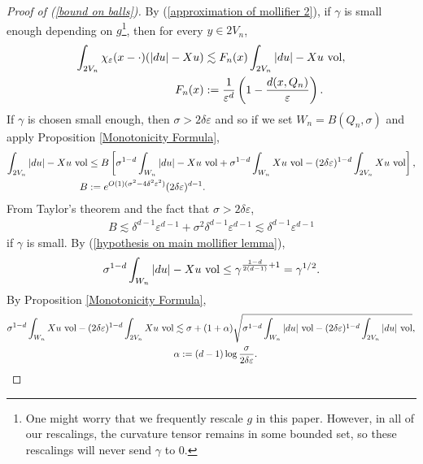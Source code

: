 \begin{proof}[Proof of (\ref{bound on balls})]
By (\ref{approximation of mollifier 2}), if $\gamma$ is small enough depending on $g$\footnote{One might worry that we frequently rescale $g$ in this paper.
However, in all of our rescalings, the curvature tensor remains in some bounded set, so these rescalings will never send $\gamma$ to $0$.}, then for every $y \in 2V_n$,
\begin{align*}
\int_{2V_n} \chi_\varepsilon(x - \cdot)(|du| - Xu) &\lesssim F_n(x) \int_{2V_n} |du| - Xu ~\mathrm{vol}, \\
F_n(x) &:= \frac{1}{\varepsilon^d}\left(1 - \frac{d(x, Q_n)}{\varepsilon}\right).
\end{align*}
If $\gamma$ is chosen small enough, then $\sigma > 2\delta\varepsilon$ and so if we set $W_n = B(Q_n, \sigma)$ and apply Proposition \ref{Monotonicity Formula},
\begin{align*}
\int_{2V_n}|du| - Xu ~\mathrm{vol} &\leq
B \left[\sigma^{1 - d}\int_{W_n} |du| - Xu ~\mathrm{vol} + \sigma^{1 - d}\int_{W_n} Xu ~\mathrm{vol} - (2\delta\varepsilon)^{1 - d}\int_{2V_n} Xu ~\mathrm{vol} \right],\\
B &:= e^{O(1)(\sigma^2 - 4\delta^2\varepsilon^2)}(2\delta\varepsilon)^{d - 1}.
\end{align*}
From Taylor's theorem and the fact that $\sigma > 2\delta\varepsilon$,
\begin{align*}
B \lesssim \delta^{d - 1} \varepsilon^{d - 1} + \sigma^2 \delta^{d - 1} \varepsilon^{d - 1} \lesssim \delta^{d - 1} \varepsilon^{d - 1}
\end{align*}
if $\gamma$ is small.
By (\ref{hypothesis on main mollifier lemma}),
$$\sigma^{1 - d}\int_{W_n} |du| - Xu ~\mathrm{vol} \leq \gamma^{\frac{1 - d}{2(d - 1)} + 1} = \gamma^{1/2}.$$
By Proposition \ref{Monotonicity Formula},
\begin{align*}
\sigma^{1 - d}\int_{W_n} Xu ~\mathrm{vol} - (2\delta\varepsilon)^{1 - d}\int_{2V_n} Xu ~\mathrm{vol} &\lesssim \sigma + (1 + \alpha)\sqrt{\sigma^{1 - d} \int_{W_n} |du| ~\mathrm{vol} - (2\delta\varepsilon)^{1 - d} \int_{2V_n} |du| ~\mathrm{vol}},\\
&\alpha := (d - 1)\log \frac{\sigma}{2\delta\varepsilon}.
\end{align*}


\end{proof}
